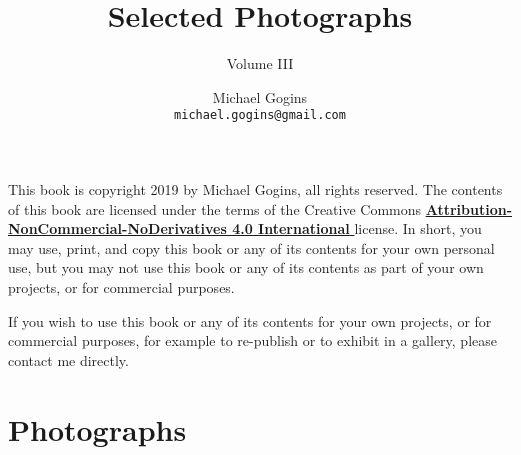

\frontmatter
\title{Selected Photographs}
\author{Michael Gogins \\ \texttt{michael.gogins@gmail.com}}
\subtitle{Volume III}
\dedication{This book is for Mick.}
\newpage
\noindent This book is copyright 2019 by Michael Gogins, all rights reserved. The contents of this book are licensed under the terms of the Creative Commons \href{https://creativecommons.org/licenses/by-nc-nd/4.0/legalcode}{\textbf{Attribution-NonCommercial-NoDerivatives 4.0 International} } license. In short, you may use, print, and copy this book or any of its contents for your own personal use, but you may not use this book or any of its contents as part of your own projects, or for commercial purposes.

If you wish to use this book or any of its contents for your own projects, or for commercial purposes, for example to re-publish or to exhibit in a gallery, please contact me directly.
\maketitle

\tableofcontents
{
	\setlength{}
	\raggedright
	\listoffigures
}

\mainmatter
{}

\chapter{Photographs}







